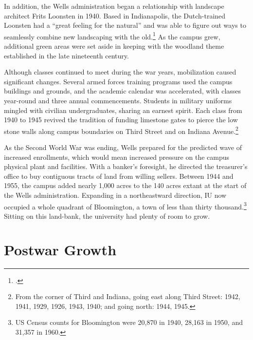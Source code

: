 \documentclass[
  american,
  letterpaper,
]{scrreprt}
\begin{document}
In addition, the Wells administration began a relationship with
landscape architect Frits Loonsten in 1940. Based in Indianapolis, the
Dutch-trained Loonsten had a ``great feeling for the natural'' and was
able to figure out ways to seamlessly combine new landscaping with the
old.\footnote{.}
As the campus grew, additional green areas were set aside in keeping
with the woodland theme established in the late nineteenth century.

Although classes continued to meet during the war years, mobilization
caused significant changes. Several armed forces training programs used
the campus buildings and grounds, and the academic calendar was
accelerated, with classes year-round and three annual commencements.
Students in military uniforms mingled with civilian undergraduates,
sharing an earnest spirit. Each class from 1940 to 1945 revived the
tradition of funding limestone gates to pierce the low stone walls along
campus boundaries on Third Street and on Indiana Avenue.\footnote{From
  the corner of Third and Indiana, going east along Third Street: 1942,
  1941, 1929, 1926, 1943, 1940; and going north: 1944, 1945.}

As the Second World War was ending, Wells prepared for the predicted
wave of increased enrollments, which would mean increased pressure on
the campus physical plant and facilities. With a banker's foresight, he
directed the treasurer's office to buy contiguous tracts of land from
willing sellers. Between 1944 and 1955, the campus added nearly 1,000
acres to the 140 acres extant at the start of the Wells administration.
Expanding in a northeastward direction, IU now occupied a whole quadrant
of Bloomington, a town of less than thirty thousand.\footnote{US Census
  counts for Bloomington were 20,870 in 1940, 28,163 in 1950, and 31,357
  in 1960.} Sitting on this land-bank, the university had plenty of room
to grow.

\section{Postwar Growth}\label{postwar-growth}
\end{document}
